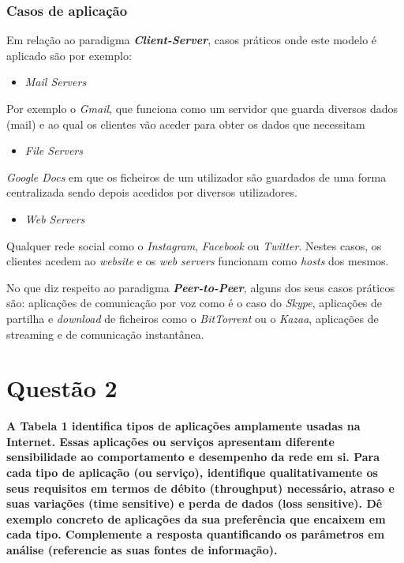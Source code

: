 \documentclass[a4paper, 11pt]{article}
\begin{document}
\subsubsection{Casos de aplicação}

Em relação ao paradigma \textbf{\textit{Client-Server}}, casos práticos onde este modelo é aplicado são por exemplo:

\begin{itemize}
  \item \textit{Mail Servers}
\end{itemize}

Por exemplo o \textit{Gmail}, que funciona como um servidor que guarda diversos dados (mail) e ao qual os clientes vão aceder para obter os dados que necessitam

\begin{itemize}
  \item \textit{File Servers}
\end{itemize}

\textit{Google Docs} em que os ficheiros de um utilizador são guardados de uma forma centralizada sendo depois acedidos por diversos utilizadores.

\begin{itemize}
  \item \textit{Web Servers}
\end{itemize}

Qualquer rede social como o \textit{Instagram}, \textit{Facebook} ou \textit{Twitter}. Nestes casos, os clientes acedem ao \textit{website} e os \textit{web servers} funcionam como \textit{hosts} dos mesmos.

\vspace{0.25cm}

No que diz respeito ao paradigma \textbf{\textit{Peer-to-Peer}}, alguns dos seus casos práticos são: aplicações de comunicação por voz como é o caso do \textit{Skype}, aplicações de partilha e \textit{download} de ficheiros como o \textit{BitTorrent} ou o \textit{Kazaa}, aplicações de streaming e de comunicação instantânea. 

\vspace{0.5cm}


\clearpage

\section {Questão 2}
\textbf{A Tabela 1 identifica tipos de aplicações amplamente usadas na Internet. Essas aplicações ou serviços apresentam
diferente sensibilidade ao comportamento e desempenho da rede em si. Para cada tipo de aplicação (ou serviço),
identifique qualitativamente os seus requisitos em termos de débito (throughput) necessário, atraso e suas variações (time
sensitive) e perda de dados (loss sensitive). Dê exemplo concreto de aplicações da sua preferência que encaixem em cada
tipo. Complemente a resposta quantificando os parâmetros em análise (referencie as suas fontes de informação).}
\end{document}
